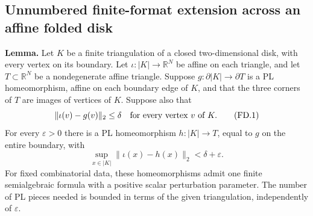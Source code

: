 \subsection*{Unnumbered finite-format extension across an affine folded disk}

\textbf{Lemma.}\quad
Let $K$ be a finite triangulation of a closed two-dimensional disk,
with every vertex on its boundary. Let
$\iota:|K|\to\mathbb R^N$ be affine on each triangle, and let
$T\subset\mathbb R^N$ be a nondegenerate affine triangle. Suppose
$g:\partial|K|\to\partial T$ is a PL homeomorphism, affine on each
boundary edge of $K$, and that the three corners of $T$ are images
of vertices of $K$. Suppose also that
\[
 \|\iota(v)-g(v)\|_2\le\delta
 \quad\hbox{for every vertex }v\hbox{ of }K.
 \tag{FD.1}
\]
For every $\varepsilon>0$ there is a PL homeomorphism
$h:|K|\to T$, equal to $g$ on the entire boundary, with
\[
 \sup_{x\in|K|}\|\iota(x)-h(x)\|_2<\delta+\varepsilon.
 \tag{FD.2}
\]
For fixed combinatorial data, these homeomorphisms admit one finite
semialgebraic formula with a positive scalar perturbation parameter.
The number of PL pieces needed is bounded in terms of the given
triangulation, independently of $\varepsilon$.

